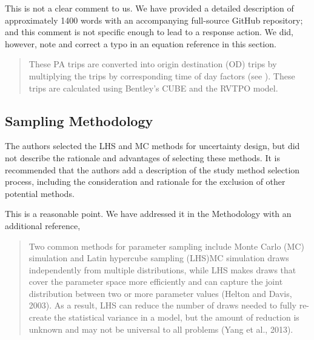 \documentclass{ar2rc}
\begin{document}
\AR This is not a clear comment to us. We have provided a detailed description
of approximately 1400 words with an accompanying full-source GitHub repository;
and this comment is not specific enough to lead to a response action. We did, however, 
note and correct a typo in an equation reference in this section.

\begin{quote}
 These PA trips are converted into origin
destination (OD) trips by multiplying the trips by corresponding time of
day factors (see \DIFdelbegin {}\DIFdelend \DIFaddbegin {}\DIFaddend ). These trips are calculated using Bentley's
CUBE and the RVTPO model.
\end{quote}


\subsection{Sampling Methodology}
\RC The authors selected the LHS and MC methods for uncertainty design, but did
not describe the rationale and advantages of selecting these methods. It is
recommended that the authors add a description of the study method selection
process, including the consideration and rationale for the exclusion of other
potential methods.

\RC This is a reasonable point. We have addressed it in the Methodology with an additional
reference,

\begin{quote}
    Two common methods for parameter sampling include \DIFdelbegin \DIFdel{, }\DIFdelend Monte
Carlo (MC) simulation and Latin hypercube sampling (LHS)\DIFdelbegin {}\DIFdelend \DIFaddbegin {}\DIFaddend MC simulation
draws independently from multiple distributions, while LHS makes draws
that cover the parameter space more efficiently and can capture the
joint distribution between two or more parameter values (Helton and
Davis, 2003). As a result, LHS can reduce the number of draws needed to
fully re-create the statistical variance in a model, but the amount of
reduction is unknown and may not be universal to all problems (Yang et
al., 2013).  \DIFaddbegin {}\DIFaddend 


\DIFaddend 
\end{quote}
\end{document}
